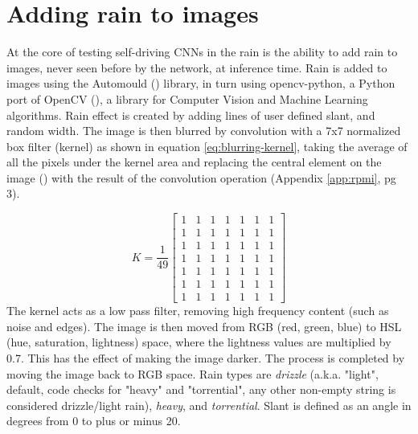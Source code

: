 \section{Adding rain to images}
\label{methods:AddingRainToImages}
At the core of testing self-driving CNNs in the rain is the ability to add rain to images, never seen before by the network, at inference time.
Rain is added to images using the Automould (\cite{Saxena2017}) library, in turn using opencv-python, a Python port of OpenCV (\cite{mordvintsev2014opencv}), a library for Computer Vision and Machine Learning algorithms. Rain effect is created by adding lines of user defined slant, and random width. The image is then blurred by convolution with a 7x7 normalized box filter (kernel) as shown in equation \ref{eq:blurring-kernel}, taking the average of all the pixels under the kernel area and replacing the central element on the image (\cite{documentationOpenCV2020}) with the result of the convolution operation (Appendix \ref{app:rpmi}, pg 3).

\begin{equation}
\label{eq:blurring-kernel}
    K = \frac{1}{49} \begin{bmatrix} 1 & 1 & 1 & 1 & 1 & 1 & 1 \\ 
    1 & 1 & 1 & 1 & 1 & 1 & 1 \\ 
    1 & 1 & 1 & 1 & 1 & 1 & 1 \\ 
    1 & 1 & 1 & 1 & 1 & 1 & 1 \\ 
    1 & 1 & 1 & 1 & 1 & 1 & 1 \\ 
    1 & 1 & 1 & 1 & 1 & 1 & 1 \\ 
    1 & 1 & 1 & 1 & 1 & 1 & 1 \end{bmatrix}
\end{equation}
The kernel acts as a low pass filter, removing high frequency content (such as noise and edges). The image is then moved from RGB (red, green, blue) to HSL (hue, saturation, lightness) space, where the lightness values are multiplied by 0.7. This has the effect of making the image darker. The process is completed by moving the image back to RGB space. Rain types are \textit{drizzle} (a.k.a. "light", default, code checks for "heavy" and "torrential", any other non-empty string is considered drizzle/light rain), \textit{heavy}, and \textit{torrential}. Slant is defined as an angle in degrees from 0 to plus or minus 20.


